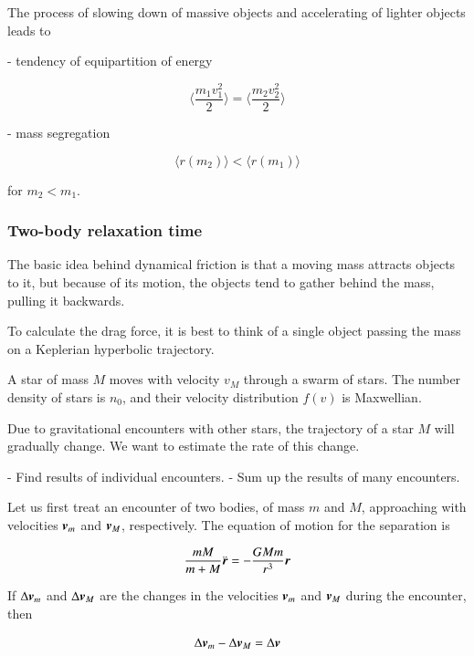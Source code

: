 The process of slowing down of massive objects and accelerating of lighter objects leads to 

- tendency of equipartition of energy 

\begin{equation}
\langle \frac{m_1v_1^2}{2} \rangle =\langle \frac{m_2v_2^2}{2} \rangle 
\end{equation}

- mass segregation

\begin{equation}
\langle r(m_2) \rangle < \langle r(m_1) \rangle 
\end{equation}

for $m_2 < m_1$. 


\subsubsection{Two-body relaxation time}

The basic idea behind dynamical friction is that a moving mass attracts objects to it, but because of its motion, the objects tend to gather behind the mass, pulling it backwards. 

To calculate the drag force, it is best to think of a single object passing the mass on a Keplerian hyperbolic trajectory.

A star of mass $M$ moves with velocity $v_M$ through a swarm of stars. The number density of stars is $n_0$, and their velocity distribution $f(v)$ is Maxwellian. 

Due to gravitational encounters with other stars, the trajectory of a star $M$ will gradually change. We want to estimate the rate of this change. 

- Find results of individual encounters.
- Sum up the results of many encounters.


Let us first treat an encounter of two bodies, of mass $m$ and $M$, approaching with velocities ${\boldsymbol{v}}_m$ and ${\boldsymbol{v}}_M$, respectively. The equation of motion for the separation is


\begin{equation}
\frac{mM}{m+M} \ddot{{\boldsymbol{r}}} = -\frac{GMm}{r^3}{\boldsymbol{r}}
\end{equation}


If $\Delta {\boldsymbol{v}}_m$ and $\Delta {\boldsymbol{v}}_M$ are the changes in the velocities ${\boldsymbol{v}}_m$ and ${\boldsymbol{v}}_M$ during the encounter, then 

\begin{equation}
\Delta {\boldsymbol{v}}_m - \Delta {\boldsymbol{v}}_M = \Delta {\boldsymbol{v}} 
\end{equation}

